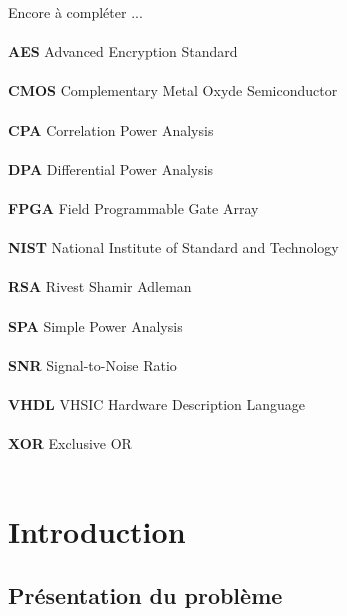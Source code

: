 \documentclass[oneside]{book}
\begin{document}
\hspace{-0.5 cm}Encore à compléter ... \\ \\
\hspace{-0.5cm}\textbf{AES} \hfill Advanced Encryption Standard \\ \\
\textbf{CMOS} \hfill Complementary Metal Oxyde Semiconductor \\ \\
\textbf{CPA} \hfill Correlation Power Analysis \\ \\
\textbf{DPA} \hfill Differential Power Analysis \\ \\
\textbf{FPGA} \hfill Field Programmable Gate Array \\ \\
\textbf{NIST} \hfill National Institute of Standard and Technology \\ \\
\textbf{RSA} \hfill Rivest Shamir Adleman \\ \\
\textbf{SPA} \hfill Simple Power Analysis \\ \\
\textbf{SNR} \hfill Signal-to-Noise Ratio \\ \\
\textbf{VHDL} \hfill VHSIC Hardware Description Language \\ \\
\textbf{XOR} \hfill Exclusive OR \\ \\

\newpage
\strut
\thispagestyle{empty}
\newpage
{}



\chapter{Introduction}

\section{Présentation du problème}
\end{document}
